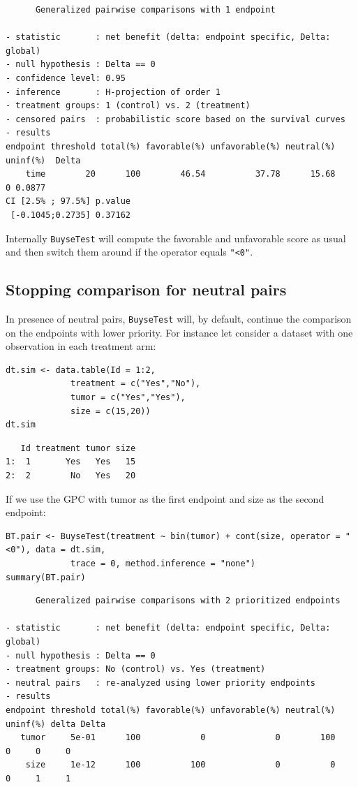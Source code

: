 \documentclass[12pt]{article}
\begin{document}
\begin{verbatim}
      Generalized pairwise comparisons with 1 endpoint

- statistic       : net benefit (delta: endpoint specific, Delta: global) 
- null hypothesis : Delta == 0 
- confidence level: 0.95 
- inference       : H-projection of order 1
- treatment groups: 1 (control) vs. 2 (treatment) 
- censored pairs  : probabilistic score based on the survival curves
- results
endpoint threshold total(%) favorable(%) unfavorable(%) neutral(%) uninf(%)  Delta
    time        20      100        46.54          37.78      15.68        0 0.0877
CI [2.5% ; 97.5%] p.value 
 [-0.1045;0.2735] 0.37162
\end{verbatim}

Internally \texttt{BuyseTest} will compute the favorable and unfavorable
score as usual and then switch them around if the operator equals
\texttt{"<0"}.

\clearpage

\subsection{Stopping comparison for neutral pairs}
\label{sec:org644b4c8}
In presence of neutral pairs, \texttt{BuyseTest} will, by default, continue
the comparison on the endpoints with lower priority. For instance let
consider a dataset with one observation in each treatment arm:
\lstset{language=r,label= ,caption= ,captionpos=b,numbers=none}
\begin{lstlisting}
dt.sim <- data.table(Id = 1:2,
		     treatment = c("Yes","No"),
		     tumor = c("Yes","Yes"),
		     size = c(15,20))
dt.sim
\end{lstlisting}

\begin{verbatim}
   Id treatment tumor size
1:  1       Yes   Yes   15
2:  2        No   Yes   20
\end{verbatim}


\bigskip

If we use the GPC with tumor as the first endpoint and size as the
second endpoint:
\lstset{language=r,label= ,caption= ,captionpos=b,numbers=none}
\begin{lstlisting}
BT.pair <- BuyseTest(treatment ~ bin(tumor) + cont(size, operator = "<0"), data = dt.sim,
		     trace = 0, method.inference = "none")
summary(BT.pair)
\end{lstlisting}

\begin{verbatim}
      Generalized pairwise comparisons with 2 prioritized endpoints

- statistic       : net benefit (delta: endpoint specific, Delta: global) 
- null hypothesis : Delta == 0 
- treatment groups: No (control) vs. Yes (treatment) 
- neutral pairs   : re-analyzed using lower priority endpoints
- results
endpoint threshold total(%) favorable(%) unfavorable(%) neutral(%) uninf(%) delta Delta
   tumor     5e-01      100            0              0        100        0     0     0
    size     1e-12      100          100              0          0        0     1     1
\end{verbatim}
\end{document}
